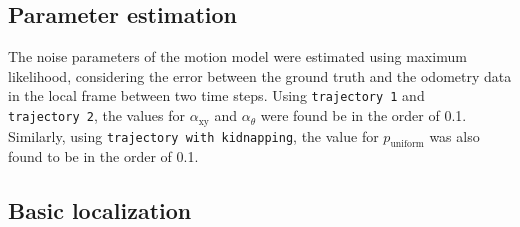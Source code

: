 \documentclass[letterpaper, 10pt, conference]{ieeeconf}
\begin{document}

\subsection{Parameter estimation}
\label{sec:mle}

The noise parameters of the motion model were estimated using maximum likelihood, considering the error between the ground truth and the odometry data in the local frame between two time steps.
Using \texttt{trajectory~1} and \texttt{trajectory~2}, the values for  $\alpha_\mathrm{xy}$ and $\alpha_\theta$ were found be in the order of 0.1.
Similarly, using \texttt{trajectory with kidnapping}, the value for $p_\mathrm{uniform}$ was also found to be in the order of 0.1.

\subsection{Basic localization}
\end{document}
